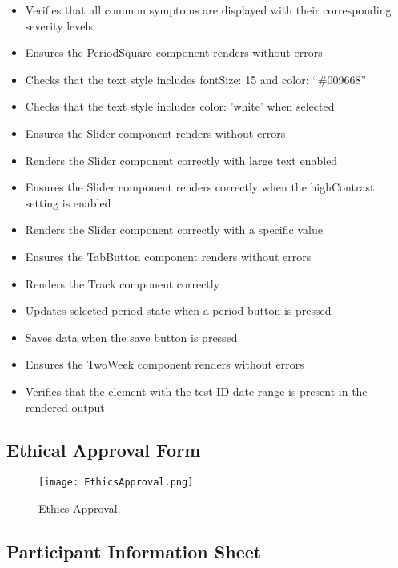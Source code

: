 \begin{itemize}
  \item Verifies that all common symptoms are displayed with their corresponding severity levels
  \item Ensures the PeriodSquare component renders without errors
  \item Checks that the text style includes fontSize: 15 and color: ``\#009668''
  \item Checks that the text style includes color: 'white' when selected
  \item Ensures the Slider component renders without errors
  \item Renders the Slider component correctly with large text enabled
  \item Ensures the Slider component renders correctly when the highContrast setting is enabled
  \item Renders the Slider component correctly with a specific value
  \item Ensures the TabButton component renders without errors
  \item Renders the Track component correctly
  \item Updates selected period state when a period button is pressed
  \item Saves data when the save button is pressed
  \item Ensures the TwoWeek component renders without errors
  \item Verifies that the element with the test ID date-range is present in the rendered output
\end{itemize}

\subsection{Ethical Approval Form}

\begin{figure}[h!!]
    \begin{center}
      \texttt{[image: EthicsApproval.png]}
      \caption{Ethics Approval.}
      \label{figure:ethics-approval}
    \end{center}
  \end{figure}
  
\subsection{Participant Information Sheet }


